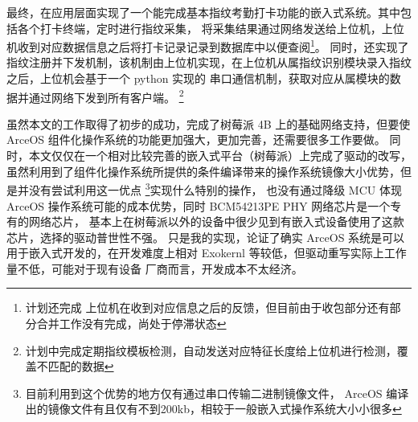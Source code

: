 最终，在应用层面实现了一个能完成基本指纹考勤打卡功能的嵌入式系统。其中包括各个打卡终端，定时进行指纹采集，
将采集结果通过网络发送给上位机，上位机收到对应数据信息之后将打卡记录记录到数据库中以便查阅\footnote{计划还完成
上位机在收到对应信息之后的反馈，但目前由于收包部分还有部分合并工作没有完成，尚处于停滞状态}。
同时，还实现了指纹注册并下发机制，该机制由上位机实现，在上位机从属指纹识别模块录入指纹之后，上位机会基于一个 python 实现的
串口通信机制，获取对应从属模块的数据并通过网络下发到所有客户端。
\footnote{计划中完成定期指纹模板检测，自动发送对应特征长度给上位机进行检测，覆盖不匹配的数据}

虽然本文的工作取得了初步的成功，完成了树莓派 4B 上的基础网络支持，但要使 ArceOS 组件化操作系统的功能更加强大，更加完善，还需要很多工作要做。
同时，本文仅仅在一个相对比较完善的嵌入式平台（树莓派）上完成了驱动的改写，
虽然利用到了组件化操作系统所提供的条件编译带来的操作系统镜像大小优势，但是并没有尝试利用这一优点
\footnote{目前利用到这个优势的地方仅有通过串口传输二进制镜像文件，
ArceOS 编译出的镜像文件有且仅有不到200kb，相较于一般嵌入式操作系统大小小很多}实现什么特别的操作，
也没有通过降级 MCU 体现 ArceOS 操作系统可能的成本优势，同时 BCM54213PE PHY 网络芯片是一个专有的网络芯片，
基本上在树莓派以外的设备中很少见到有嵌入式设备使用了这款芯片，选择的驱动普世性不强。
只是我的实现，论证了确实 ArceOS 系统是可以
用于嵌入式开发的，在开发难度上相对 Exokernl 等较低，但驱动重写实际上工作量不低，可能对于现有设备
厂商而言，开发成本不太经济。
